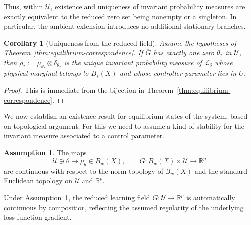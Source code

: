 \documentclass[11pt]{article}
\newtheorem{corollary}[theorem]{Corollary}
\theoremstyle{definition}
\newtheorem{assumption}[theorem]{Assumption}
\theoremstyle{remark}
\newcommand{\STO}{\mathcal{L}}
\newcommand{\R}{\mathbb{R}}
\begin{document}
Thus, within \(\mathcal U\), existence and uniqueness of invariant probability
measures are exactly equivalent to the reduced zero set being nonempty or a
singleton.  In particular, the ambient extension introduces no additional
stationary branches.

\begin{corollary}[Uniqueness from the reduced field]
\label{cor:reduced-global-uniqueness}
Assume the hypotheses of Theorem~\ref{thm:equilibrium-correspondence}.  If
\(\overline G\) has exactly one zero \(\theta_*\) in \(\mathcal U\), then $\rho_*:=\mu_{\theta_*}\otimes\delta_{\theta_*}$
is the unique invariant probability measure of $\STO_\delta$
whose physical marginal belongs to $B_s(X)$ and whose
controller parameter lies in $U$.
\end{corollary}

\begin{proof}
This is immediate from the bijection in
Theorem~\ref{thm:equilibrium-correspondence}.
\end{proof}

We now establish an existence result for equilibrium states of the system, based on topological argument. For this we need to assume a kind of stability for the invariant measure associated to a control parameter.

\begin{assumption}
\label{ass:stationary-continuity}
The maps
\[
  \mathcal U\ni\theta\longmapsto\mu_\theta\in B_w(X),
  \qquad
  G:B_w(X)\times\mathcal U\longrightarrow\R^p
\]
are continuous with respect to the norm topology of \(B_w(X)\) and the standard Euclidean topology on \(\mathcal{U}\) and \(\R^p\). 
\end{assumption}

Under Assumption~\ref{ass:stationary-continuity}, the reduced learning field
\(\overline G:\mathcal U\to\R^p\) is automatically continuous by composition, reflecting the assumed regularity of the underlying loss function gradient. %
\end{document}
